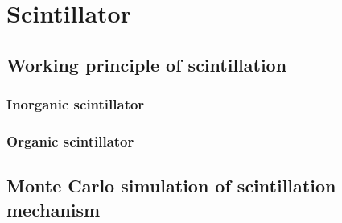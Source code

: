 \chapter{Scintillator}

\section{Working principle of scintillation}
\subsection{Inorganic scintillator}
\subsection{Organic scintillator}

\section{Monte Carlo simulation of scintillation mechanism}

